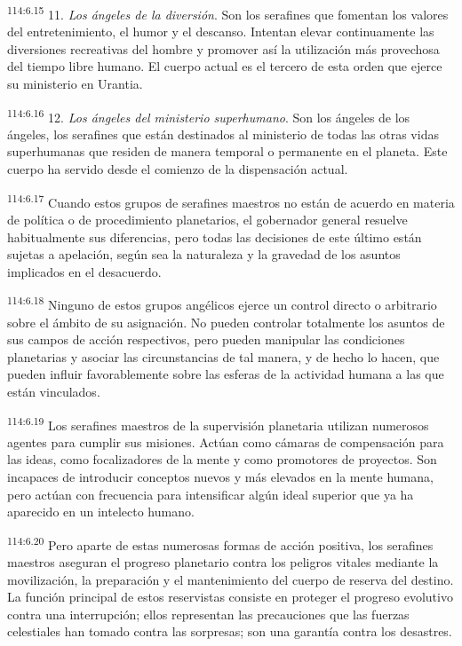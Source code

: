 \par
\textsuperscript{114:6.15} 11. \textit{Los ángeles de la diversión}. Son los serafines que fomentan los valores del entretenimiento, el humor y el descanso. Intentan elevar continuamente las diversiones recreativas del hombre y promover así la utilización más provechosa del tiempo libre humano. El cuerpo actual es el tercero de esta orden que ejerce su ministerio en Urantia.

\par
\textsuperscript{114:6.16} 12. \textit{Los ángeles del ministerio superhumano}. Son los ángeles de los ángeles, los serafines que están destinados al ministerio de todas las otras vidas superhumanas que residen de manera temporal o permanente en el planeta. Este cuerpo ha servido desde el comienzo de la dispensación actual.

\par
\textsuperscript{114:6.17} Cuando estos grupos de serafines maestros no están de acuerdo en materia de política o de procedimiento planetarios, el gobernador general resuelve habitualmente sus diferencias, pero todas las decisiones de este último están sujetas a apelación, según sea la naturaleza y la gravedad de los asuntos implicados en el desacuerdo.

\par
\textsuperscript{114:6.18} Ninguno de estos grupos angélicos ejerce un control directo o arbitrario sobre el ámbito de su asignación. No pueden controlar totalmente los asuntos de sus campos de acción respectivos, pero pueden manipular las condiciones planetarias y asociar las circunstancias de tal manera, y de hecho lo hacen, que pueden influir favorablemente sobre las esferas de la actividad humana a las que están vinculados.

\par
\textsuperscript{114:6.19} Los serafines maestros de la supervisión planetaria utilizan numerosos agentes para cumplir sus misiones. Actúan como cámaras de compensación para las ideas, como focalizadores de la mente y como promotores de proyectos. Son incapaces de introducir conceptos nuevos y más elevados en la mente humana, pero actúan con frecuencia para intensificar algún ideal superior que ya ha aparecido en un intelecto humano.

\par
\textsuperscript{114:6.20} Pero aparte de estas numerosas formas de acción positiva, los serafines maestros aseguran el progreso planetario contra los peligros vitales mediante la movilización, la preparación y el mantenimiento del cuerpo de reserva del destino. La función principal de estos reservistas consiste en proteger el progreso evolutivo contra una interrupción; ellos representan las precauciones que las fuerzas celestiales han tomado contra las sorpresas; son una garantía contra los desastres.

